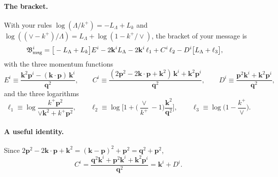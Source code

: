 \documentclass[10pt]{article}
\numberwithin{equation}{section}
\newcommand{\bk}{\mathbf k}
\newcommand{\bp}{\mathbf p}
\newcommand{\bq}{\mathbf q}
\begin{document}
\paragraph{The bracket.} With your rules $\log(\Lambda/k^+)=-L_\Lambda+L_k$ and $\log((\vee-k^+)/\Lambda)=L_\Lambda+\log(1-k^+/\vee)$, the bracket of your message is
\begin{align}
\mathfrak B^i_{\rm msg}={}&\big[-L_\Lambda+L_k\big]E^i-2\bk^iL_\Lambda-2\bk^i\,\ell_1+C^i\,\ell_2-D^i\big[L_\Lambda+\ell_3\big],
\label{eq:Bmsg}
\end{align}
with the three momentum functions
\begin{equation}
E^i\equiv\frac{\bk^2\bp^i-(\bk\cdot\bp)\,\bk^i}{\bq^2},\qquad
C^i\equiv\frac{(2\bp^2-2\bk\cdot\bp+\bk^2)\,\bk^i+\bk^2\bp^i}{\bq^2},\qquad
D^i\equiv\frac{\bp^2\bk^i+\bk^2\bp^i}{\bq^2},
\label{eq:ECD}
\end{equation}
and the three logarithms
\begin{equation}
\ell_1\equiv\log\frac{k^+\bp^2}{\vee\bk^2+k^+\bp^2},\qquad
\ell_2\equiv\log\Big[1+\Big(\frac{\vee}{k^+}-1\Big)\frac{\bk^2}{\bq^2}\Big],\qquad
\ell_3\equiv\log\Big(1-\frac{k^+}{\vee}\Big).
\end{equation}
\paragraph{A useful identity.} Since $2\bp^2-2\bk\cdot\bp+\bk^2=(\bk-\bp)^2+\bp^2=\bq^2+\bp^2$,
\begin{equation}
C^i=\frac{\bq^2\bk^i+\bp^2\bk^i+\bk^2\bp^i}{\bq^2}=\bk^i+D^i .
\label{eq:CD}
\end{equation}
\end{document}
